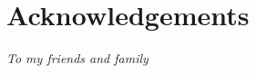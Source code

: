 \section*{\centering Acknowledgements}
\vspace*{2\baselineskip}
\begin{center}
\textit{\centering To my friends and family}
\end{center}
